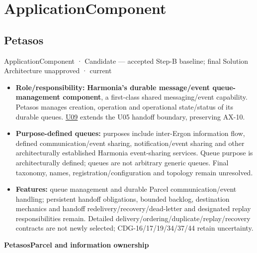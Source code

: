 \section{ApplicationComponent}

\subsection{Petasos}

\label{element:195e5f10db8e419391354197b5d7a8cc}
{\small ApplicationComponent · Candidate — accepted Step-B baseline; final Solution Architecture unapproved · current}\par

\begin{itemize}


\item \textbf{Role/responsibility:} \textbf{Harmonia's durable message/event queue-management
  component}, a first-class shared messaging/event capability. Petasos manages
  creation, operation and operational state/status of its durable queues.
  \href{\detokenize{../../../../../docs/markdown/05-information-systems-architecture/sources.md#u09}}{U09} extends the U05 handoff boundary, preserving AX-10.

\item \textbf{Purpose-defined queues:} purposes include inter-Ergon information flow,
  defined communication/event sharing, notification/event sharing and other
  architecturally established Harmonia event-sharing services. Queue purpose is
  architecturally defined; queues are not arbitrary generic queues. Final taxonomy,
  names, registration/configuration and topology remain unresolved.

\item \textbf{Features:} queue management and durable Parcel communication/event handling;
  persistent handoff obligations, bounded backlog, destination mechanics and
  handoff redelivery/recovery/dead-letter and designated replay responsibilities
  remain. Detailed delivery/ordering/duplicate/replay/recovery contracts are not
  newly selected; CDG-16/17/19/34/37/44 retain uncertainty.

\end{itemize}






\par\medskip\textbf{PetasosParcel and information ownership}\par


